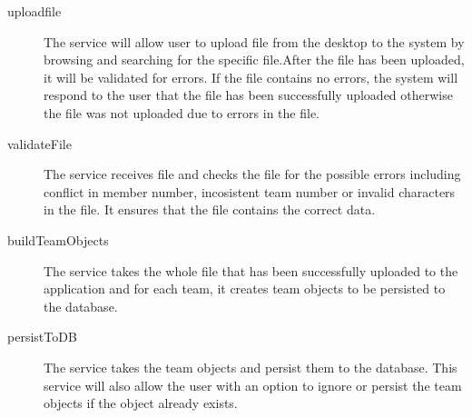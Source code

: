 

\begin{description}
\item[uploadfile] The service will allow user to upload file from the desktop to the system  by browsing and searching for the specific file.After the file has been uploaded, it will be validated for errors. If the file contains no errors, the system will respond to the user that the file has been successfully uploaded otherwise the file was not uploaded due to errors in the file.


\item[validateFile] The service receives file and checks the file for the possible errors including conflict in member number, incosistent team number or invalid characters in the file. It ensures that the file contains the correct data.

\item[buildTeamObjects] The service takes the whole file that has been successfully uploaded to the application and for each team, it creates team objects to be persisted to the database. 

\item[persistToDB] The service takes the team objects and persist them to the database. This service will also allow the user with an option to ignore or persist the team objects if the object already exists. 

\end{description}  
